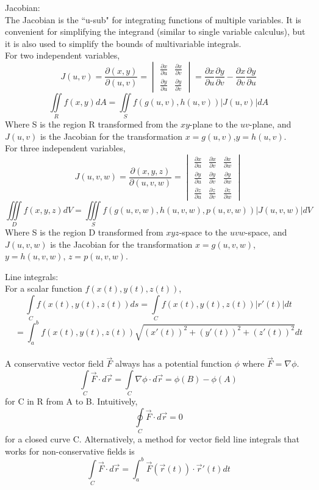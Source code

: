 \documentclass{article}
\begin{document}
Jacobian:
\\The Jacobian is the ``u-sub" for integrating functions of multiple variables. It is convenient for simplifying the integrand (similar to single variable calculus), but it is also used to simplify the bounds of multivariable integrals. 
\\For two independent variables,
$$J(u,v) = \frac{\partial (x,y)}{\partial (u,v)}=\begin{vmatrix}
    \frac{\partial x}{\partial u}& \frac{\partial x}{\partial v}  \\
    \frac{\partial y}{\partial u} & \frac{\partial y}{\partial v}  
\end{vmatrix} = \frac{\partial x}{\partial u} \frac{\partial y}{\partial v} - \frac{\partial x}{\partial v} \frac{\partial y}{\partial u} $$
$$\iint\limits_R f(x,y)dA = \iint\limits_S f(g(u,v),h(u,v))|J(u,v)|dA$$
Where S is the region R transformed from the $xy$-plane to the $uv$-plane, and $J(u,v)$ is the Jacobian for the transformation $x=g(u,v)$,$y=h(u,v)$.
\\For three independent variables,
$$J(u,v,w) = \frac{\partial (x,y,z)}{\partial (u,v,w)}=\begin{vmatrix}
    \frac{\partial x}{\partial u}& \frac{\partial x}{\partial v}& \frac{\partial x}{\partial w}  \\
    \frac{\partial y}{\partial u} & \frac{\partial y}{\partial v}& \frac{\partial y}{\partial w} \\
    \frac{\partial z}{\partial u} & \frac{\partial z}{\partial v}& \frac{\partial z}{\partial w}
\end{vmatrix} $$
$$\iiint\limits_D f(x,y,z)dV = \iiint\limits_S f(g(u,v,w),h(u,v,w),p(u,v,w))|J(u,v,w)|dV$$
Where S is the region D transformed from $xyz$-space to the $uvw$-space, and $J(u,v,w)$ is the Jacobian for the transformation $x=g(u,v,w)$, $y=h(u,v,w)$, $z=p(u,v,w)$.

\pagebreak
Line integrals:
\\For a scalar function $f(x(t),y(t),z(t))$,
$$\int \limits_C f(x(t),y(t),z(t)) ds = \int \limits_C f(x(t),y(t),z(t)) |r'(t)|dt$$ $$=\int_a^b f(x(t),y(t),z(t)) \sqrt{(x'(t))^2 +(y'(t))^2 + (z'(t))^2} dt$$
\\A conservative vector field $\vec F$ always has a potential function $\phi$ where $\vec F = \nabla \phi$. 
$$\int \limits_C \vec F \cdot d \vec r =  \int \limits_C \nabla \phi \cdot d \vec r = \phi(B) - \phi(A)$$
for C in R from A to B. Intuitively, 
$$\oint \limits_C \vec F \cdot d \vec r = 0$$
for a closed curve C. Alternatively, a method for vector field line integrals that works for non-conservative fields is
$$\int \limits_C \vec F \cdot d \vec r = \int_a^b \vec F(\vec r(t)) \cdot \vec r'(t) dt$$
\end{document}
